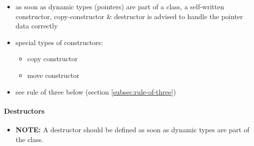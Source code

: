 \begin{itemize}
	\item as soon as dynamic types (pointers) are part of a class, a self-written constructor, copy-constructor \& destructor is advised to handle the pointer data correctly

	\item special types of constructors:
	\begin{itemize}
		\item copy constructor
		\item move constructor
	\end{itemize}

	\item see rule of three below (section \ref{subsec:rule-of-three})
\end{itemize}

\paragraph{Destructors}

\begin{itemize}
	\item 
	\begin{tcolorbox}[notitle,boxrule=0.5pt,colback=red!20,colframe=black!90]
		\textbf{NOTE:} A destructor should be defined as soon as dynamic types are part of the class. 
	\end{tcolorbox}
\end{itemize}